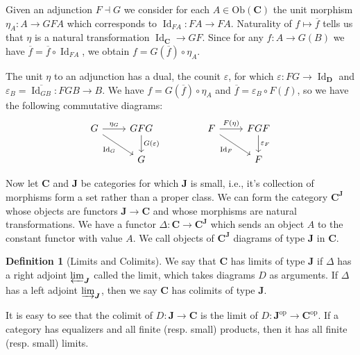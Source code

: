 \documentclass[reqno,dvipsnames]{amsart}
\let\bg\boldsymbol
\newcommand{\ol}{\overline}
\renewcommand{\epsilon}{\varepsilon}
\newcommand{\e}{\epsilon}
\DeclareMathOperator*{\Id}{Id}                       %
\newcommand{\Ob}{\text{Ob}}
\theoremstyle{definition}
\newtheorem{definition}[theorem]{Definition}
\begin{document}
{Given an adjunction $F\dashv G$ we consider for each $A\in\Ob(\bg{C})$ the unit morphism $\eta_A:A\to GFA$ which corresponds to $\Id_{FA}:FA\to FA$. Naturality of $f\mapsto\ol{f}$ tells us that $\eta$ is a natural transformation $\Id_{\bg{C}}\to GF$. Since for any $f:A\to G(B)$ we have $\ol{f}=\ol{f}\circ\Id_{FA}$, we obtain $f=G(\ol{f})\circ\eta_A$.

The unit $\eta$ to an adjunction has a dual, the counit $\e$, for which $\e:FG\to\Id_{\bg{D}}$ and $\e_B=\ol{\Id_{GB}}:FGB\to B$. We have $f=G(\ol{f})\circ\eta_A$ and $\ol{f}=\e_B\circ F(f)$, so we have the following commutative diagrams:
\[\begin{tikzcd}
	G & GFG && F & FGF \\
	& G &&& F
	\arrow["{\eta_G}", from=1-1, to=1-2]
	\arrow["{G(\e)}", from=1-2, to=2-2]
	\arrow["{\Id_G}"', from=1-1, to=2-2]
	\arrow["{\e_F}", from=1-5, to=2-5]
	\arrow["{\Id_F}"', from=1-4, to=2-5]
	\arrow["{F(\eta)}", from=1-4, to=1-5]
\end{tikzcd}\]

Now let $\bg{C}$ and $\bg{J}$ be categories for which $\bg{J}$ is small, i.e., it's collection of morphisms form a set rather than a proper class. We can form the category $\bg{C}^{\bg{J}}$ whose objects are functors $\bg{J}\to\bg{C}$ and whose morphisms are natural transformations. We have a functor $\Delta:\bg{C}\to\bg{C}^{\bg{J}}$ which sends an object $A$ to the constant functor with value $A$. We call objects of $\bg{C}^{\bg{J}}$ diagrams of type $\bg{J}$ in $\bg{C}$.

\begin{definition}[Limits and Colimits]
We say that $\bg{C}$ has limits of type $\bg{J}$ if $\Delta$ has a right adjoint $\varprojlim_{\bg{J}}$ called the limit, which takes diagrams $D$ as arguments. If $\Delta$ has a left adjoint $\varinjlim_{\bg{J}}$, then we say $\bg{C}$ has colimits of type $\bg{J}$.
\end{definition}

It is easy to see that the colimit of $D:\bg{J}\to\bg{C}$ is the limit of $D:\bg{J}^{\text{op}}\to\bg{C}^{\text{op}}$. If a category has equalizers and all finite (resp. small) products, then it has all finite (resp. small) limits.

}
\end{document}
